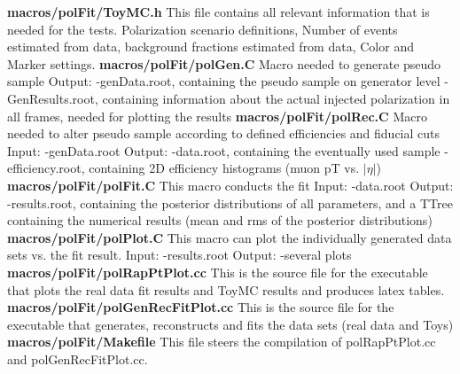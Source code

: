 \documentclass{article}
\begin{document}
{\bf macros/polFit/ToyMC.h}
This file contains all relevant information that is needed for the tests. Polarization scenario
definitions, Number of events estimated from data, background fractions estimated from data,
Color and Marker settings.
\newline
\newline
{\bf macros/polFit/polGen.C}
Macro needed to generate pseudo sample 
\newline Output:
\newline-genData.root, containing the pseudo sample on generator level
\newline-GenResults.root, containing information about the actual injected polarization in all frames,
needed for plotting the results
\newline
\newline
{\bf macros/polFit/polRec.C}
Macro needed to alter pseudo sample according to defined efficiencies and fiducial cuts
\newline Input:
\newline-genData.root
\newline Output:
\newline-data.root, containing the eventually used sample
\newline-efficiency.root, containing 2D efficiency histograms (muon pT vs. $|\eta|$)
\newline
\newline
{\bf macros/polFit/polFit.C}
This macro conducts the fit 
\newline Input:
\newline-data.root
\newline Output:
\newline-results.root, containing the posterior distributions of all parameters, and a TTree containing the
numerical results (mean and rms of the posterior distributions)
\newline
\newline
{\bf macros/polFit/polPlot.C}
This macro can plot the individually generated data sets vs. the fit result.
\newline Input:
\newline-results.root
\newline Output:
\newline-several plots
\newline
\newline
{\bf macros/polFit/polRapPtPlot.cc}
This is the source file for the executable that plots the real data fit results and ToyMC results and produces latex tables.
\newline
\newline
{\bf macros/polFit/polGenRecFitPlot.cc}
This is the source file for the executable that generates, reconstructs and fits the data sets (real data and Toys)
\newline
\newline
{\bf macros/polFit/Makefile}
This file steers the compilation of polRapPtPlot.cc and polGenRecFitPlot.cc.
\newline
\newline
\end{document}

